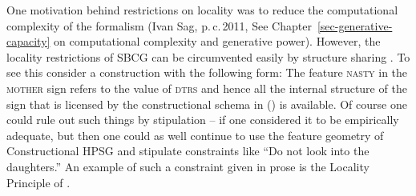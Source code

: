 
One motivation behind restrictions on locality was to reduce the computational complexity of the
formalism (Ivan Sag, p.\,c.\,2011, See Chapter~\ref{sec-generative-capacity} on computational complexity and generative power).
However, the locality restrictions of SBCG can be circumvented easily by structure sharing \citep[Section~9.6.1]{MuellerGTBuch2}. To see this consider a
construction with the following form:
\ea
{}
\z
The feature \textsc{nasty} in the \textsc{mother} sign refers to the value of \textsc{dtrs} and hence all the
internal structure of the sign that is licensed by the constructional schema in () is
available. Of course one could rule out such things by stipulation -- if one considered it
to be empirically adequate, but then one could as well continue to use the feature geometry of
Constructional HPSG \citep{Sag97a} and stipulate constraints like ``Do not look into the
daughters.'' An example of such a constraint given in prose is the Locality Principle of \citet[--144]{ps}.


